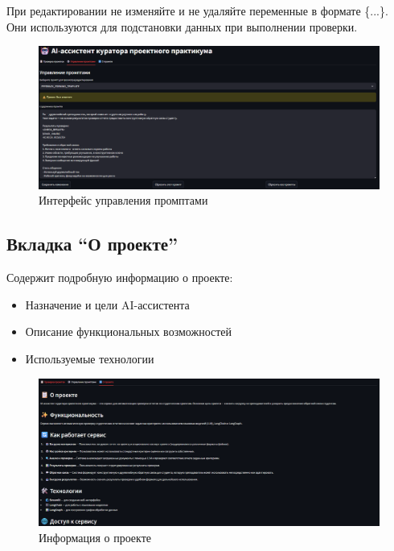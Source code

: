 \documentclass[a4paper,12pt]{article}
\begin{document}
\begin{tcolorbox}[colback=red!5!white,colframe=red!75!black,title=Важно]
При редактировании не изменяйте и не удаляйте переменные в формате \{...\}. Они используются для подстановки данных при выполнении проверки. 
\end{tcolorbox}

\begin{figure}[!htb]
    \centering
    \includegraphics[width=\linewidth]{assets/prompt_management.png}
    \caption{Интерфейс управления промптами}
\end{figure}

\FloatBarrier
\begin{samepage}
\subsection{Вкладка ``О проекте''}
Содержит подробную информацию о проекте:

\begin{itemize}
    \item Назначение и цели AI-ассистента
    \item Описание функциональных возможностей
    \item Используемые технологии
\end{itemize}
\end{samepage}

\begin{figure}[!htb]
    \centering
    \includegraphics[width=\linewidth]{assets/project_info.png}
    \caption{Информация о проекте}
\end{figure}
\end{document}

